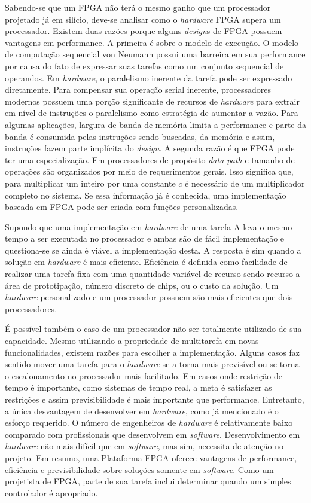 Sabendo-se que um FPGA não terá o mesmo ganho que um processador projetado já em silício, deve-se analisar como o \textit{hardware} FPGA supera um processador. Existem duas razões porque alguns \textit{design}s de FPGA possuem vantagens em performance. A primeira é sobre o modelo de execução. O modelo de computação sequencial von Neumann possui uma barreira em sua performance por causa do fato de expressar suas tarefas como um conjunto sequencial de operandos. Em \textit{hardware}, o paralelismo inerente da tarefa pode ser expressado diretamente. Para compensar sua operação serial inerente, processadores modernos possuem uma porção significante de recursos de \textit{hardware} para extrair em nível de instruções o paralelismo como estratégia de aumentar a vazão. Para algumas aplicações, largura de banda de memória limita a performance e parte da banda é consumida pelas instruções sendo buscadas, da memória e assim, instruções fazem parte implícita do \textit{design}. A segunda razão é que FPGA pode ter uma especialização. Em processadores de propósito \textit{data path} e tamanho de operações são organizados por meio de requerimentos gerais. Isso significa que, para multiplicar um inteiro por uma constante $ c $ é necessário de um multiplicador completo no sistema. Se essa informação já é conhecida, uma implementação baseada em FPGA pode ser criada com funções personalizadas.

Supondo que uma implementação em \textit{hardware} de uma tarefa A leva o mesmo tempo a ser executada no processador e ambas são de fácil implementação e questiona-se se ainda é viável a implementação desta. A resposta é sim quando a solução em \textit{hardware} é mais eficiente. Eficiência é definida como facilidade de realizar uma tarefa fixa com uma quantidade variável de recurso sendo recurso a área de prototipação, número discreto de chips, ou o custo da solução. Um \textit{hardware} personalizado e um processador possuem são mais eficientes que dois processadores.

É possível também o caso de um processador não ser totalmente utilizado de sua capacidade. Mesmo utilizando a propriedade de multitarefa em novas funcionalidades, existem razões para escolher a implementação. Alguns casos faz sentido mover uma tarefa para o \textit{hardware} se a torna mais previsível ou se torna o escalonamento no processador mais facilitado. Em casos onde restrição de tempo é importante, como sistemas de tempo real, a meta é satisfazer as restrições e assim previsibilidade é mais importante que performance. Entretanto, a única desvantagem de desenvolver em \textit{hardware}, como já mencionado é o esforço requerido. O número de engenheiros de \textit{hardware} é relativamente baixo comparado com profissionais que desenvolvem em \textit{software}. Desenvolvimento em \textit{hardware} não mais difícil que em \textit{software}, mas sim, necessita de atenção no projeto. Em resumo, uma Plataforma FPGA oferece vantagens de performance, eficiência e previsibilidade sobre soluções somente em \textit{software}. Como um projetista de FPGA, parte de sua tarefa inclui determinar quando um simples controlador é apropriado.


